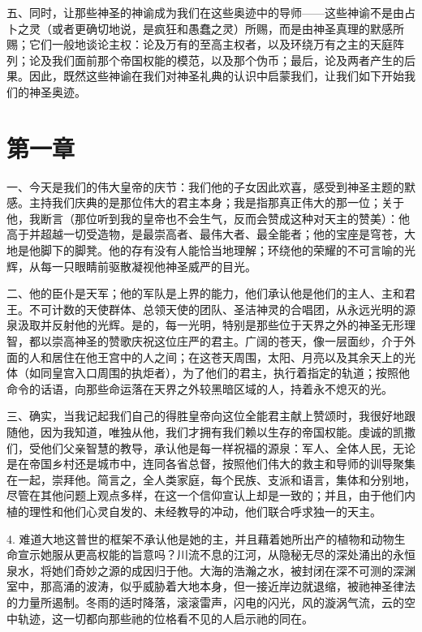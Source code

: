 五、同时，让那些神圣的神谕成为我们在这些奥迹中的导师——这些神谕不是由占卜之灵（或者更确切地说，是疯狂和愚蠢之灵）所赐，而是由神圣真理的默感所赐；它们一般地谈论主权：论及万有的至高主权者，以及环绕万有之主的天庭阵列；论及我们面前那个帝国权能的模范，以及那个伪币；最后，论及两者产生的后果。因此，既然这些神谕在我们对神圣礼典的认识中启蒙我们，让我们如下开始我们的神圣奥迹。\par


\section{第一章}

一、今天是我们的伟大皇帝的庆节：我们他的子女因此欢喜，感受到神圣主题的默感。主持我们庆典的是那位伟大的君主本身；我是指那真正伟大的那一位；关于他，我断言（那位听到我的皇帝也不会生气，反而会赞成这种对天主的赞美）：他高于并超越一切受造物，是最崇高者、最伟大者、最全能者；他的宝座是穹苍，大地是他脚下的脚凳。他的存有没有人能恰当地理解；环绕他的荣耀的不可言喻的光辉，从每一只眼睛前驱散凝视他神圣威严的目光。\par

二、他的臣仆是天军；他的军队是上界的能力，他们承认他是他们的主人、主和君王。不可计数的天使群体、总领天使的团队、圣洁神灵的合唱团，从永远光明的源泉汲取并反射他的光辉。是的，每一光明，特别是那些位于天界之外的神圣无形理智，都以崇高神圣的赞歌庆祝这位庄严的君主。广阔的苍天，像一层面纱，介于外面的人和居住在他王宫中的人之间；在这苍天周围，太阳、月亮以及其余天上的光体（如同皇宫入口周围的执炬者），为了他们的君主，执行着指定的轨道；按照他命令的话语，向那些命运落在天界之外较黑暗区域的人，持着永不熄灭的光。\par

三、确实，当我记起我们自己的得胜皇帝向这位全能君主献上赞颂时，我很好地跟随他，因为我知道，唯独从他，我们才拥有我们赖以生存的帝国权能。虔诚的凯撒们，受他们父亲智慧的教导，承认他是每一样祝福的源泉：军人、全体人民，无论是在帝国乡村还是城市中，连同各省总督，按照他们伟大的救主和导师的训导聚集在一起，崇拜他。简言之，全人类家庭，每个民族、支派和语言，集体和分别地，尽管在其他问题上观点多样，在这一个信仰宣认上却是一致的；并且，由于他们内植的理性和他们心灵自发的、未经教导的冲动，他们联合呼求独一的天主。\par

4. 难道大地这普世的框架不承认他是她的主，并且藉着她所出产的植物和动物生命宣示她服从更高权能的旨意吗？川流不息的江河，从隐秘无尽的深处涌出的永恒泉水，将她们奇妙之源的成因归于他。大海的浩瀚之水，被封闭在深不可测的深渊室中，那高涌的波涛，似乎威胁着大地本身，但一接近岸边就退缩，被祂神圣律法的力量所遏制。冬雨的适时降落，滚滚雷声，闪电的闪光，风的漩涡气流，云的空中轨迹，这一切都向那些祂的位格看不见的人启示祂的同在。\par

